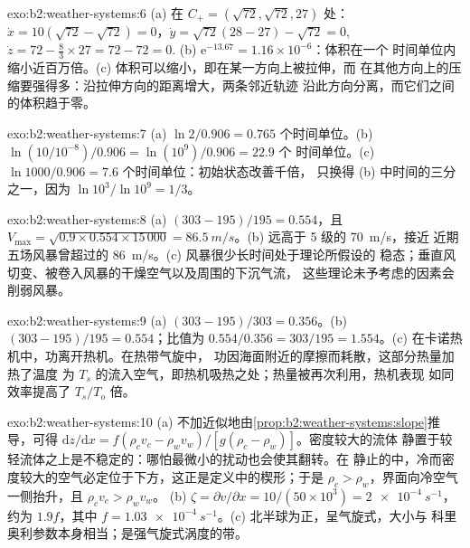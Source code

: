 \begin{solution}{exo:b2:weather-systems:6}
(a) 在 $C_+ = (\sqrt{72}, \sqrt{72}, 27)$ 处：$\dot x = 10(\sqrt{72} - \sqrt{72}) = 0$，$\dot y =
\sqrt{72}(28 - 27) - \sqrt{72} = 0$, $\dot z = 72 - \tfrac83 \times 27 = 72 - 72 = 0$.
(b) $\mathrm{e}^{-13.67} = 1.16 \times 10^{-6}$：体积在一个
时间单位内缩小近百万倍。(c) 体积可以缩小，即在某一方向上被拉伸，而
在其他方向上的压缩要强得多：沿拉伸方向的距离增大，两条邻近轨迹
沿此方向分离，而它们之间的体积趋于零。
\end{solution}

\begin{solution}{exo:b2:weather-systems:7}
(a) $\ln 2/0.906 = 0.765$ 个时间单位。(b) $\ln(10/10^{-8})/0.906 = \ln(10^9)/0.906 = 22.9$ 个
时间单位。(c) $\ln 1000/0.906 = 7.6$ 个时间单位：初始状态改善千倍，
只换得 (b) 中时间的三分之一，因为 $\ln 10^3/\ln 10^9 = 1/3$。
\end{solution}

\begin{solution}{exo:b2:weather-systems:8}
(a) $(303 - 195)/195 = 0.554$，且 $V_{\max} = \sqrt{0.9 \times 0.554 \times 15\,000} =
\qty{86.5}{m/s}$。(b) 远高于 5 级的 \qty{70}{m/s}，接近
近期五场风暴曾超过的 \qty{86}{m/s}。(c) 风暴很少长时间处于理论所假设的
稳态；垂直风切变、被卷入风暴的干燥空气以及周围的下沉气流，
这些理论未予考虑的因素会削弱风暴。
\end{solution}

\begin{solution}{exo:b2:weather-systems:9}
(a) $(303 - 195)/303 = 0.356$。(b) $(303 - 195)/195 = 0.554$；比值为 $0.554/0.356 =
303/195 = 1.554$。(c) 在卡诺热机中，功离开热机。在热带气旋中，
功因海面附近的摩擦而耗散，这部分热量加热了温度
为 $T_s$ 的流入空气，即热机吸热之处；热量被再次利用，热机表现
如同效率提高了 $T_s/T_o$ 倍。
\end{solution}

\begin{solution}{exo:b2:weather-systems:10}
(a) 不加近似地由\cref{prop:b2:weather-systems:slope}推导，可得
$\mathrm{d}z/\mathrm{d}x = f(\rho_c v_c - \rho_w v_w)/[g(\rho_c - \rho_w)]$。密度较大的流体
静置于较轻流体之上是不稳定的：哪怕最微小的扰动也会使其翻转。在
静止的中，冷而密度较大的空气必定位于下方，这正是定义中的楔形；于是
$\rho_c > \rho_w$，界面向冷空气一侧抬升，且 $\rho_c v_c > \rho_w v_w$。
(b) $\zeta = \partial v/\partial x = 10/(50 \times 10^3) = \qty{2e-4}{s^{-1}}$，约为 $1.9f$，其中
$f = \qty{1.03e-4}{s^{-1}}$。(c) 北半球为正，呈气旋式，大小与
科里奥利参数本身相当；是强气旋式涡度的带。
\end{solution}

